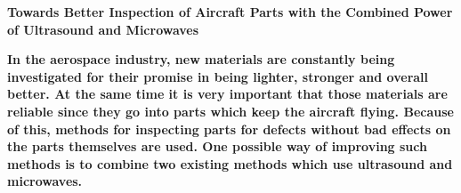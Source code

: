 \documentclass[11pt]{article}
\begin{document}
	
	\begingroup
		\centering
		\LARGE \textbf{Towards Better Inspection of Aircraft Parts with the Combined Power of Ultrasound and Microwaves} \par
		\vspace{1.0cm}
	\endgroup
	
	\begin{multicols}{2}
		\noindent
		\textbf{
			In the aerospace industry, new materials are constantly being investigated for their promise in being lighter, stronger and overall better. At the same time it is very important that those materials are reliable since they go into parts which keep the aircraft flying. Because of this, methods for inspecting parts for defects without bad effects on the parts themselves are used. One possible way of improving such methods is to combine two existing methods which use ultrasound and microwaves.
		}
		
		\noindent
		\lipsum[2-3]
	\end{multicols}
	
\end{document}
